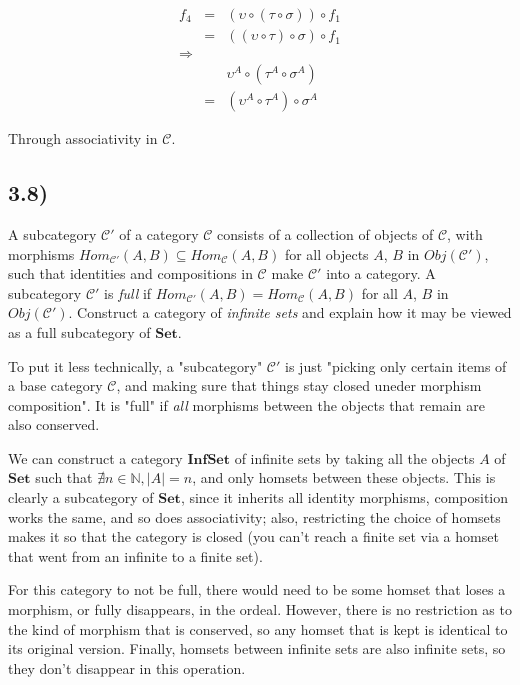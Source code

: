 \documentclass[12pt, letterpaper, twoside]{report}
\begin{document}
$$
\begin{aligned}
f_4 &=& ( \upsilon \circ (\tau  \circ \sigma)) \circ f_1 \\
	&=& ((\upsilon \circ  \tau) \circ \sigma ) \circ f_1 \\
\Rightarrow && \\
    & &  \upsilon^A \circ (\tau^A  \circ \sigma^A) \\
    &=& (\upsilon^A \circ  \tau^A) \circ \sigma^A
\end{aligned}
$$

Through associativity in $\mathcal{C}$.


\subsection*{3.8)}

A subcategory $\mathcal{C'}$ of a category $\mathcal{C}$ consists of a collection of objects of $\mathcal{C}$, with morphisms $Hom_\mathcal{C'} (A, B) \subseteq Hom_\mathcal{C} (A, B)$ for all objects $A$, $B$ in $Obj(\mathcal{C'})$, such that identities and compositions in $\mathcal{C}$ make $\mathcal{C'}$ into a category. A subcategory $\mathcal{C'}$ is \textit{full} if $Hom_\mathcal{C'} (A, B) = Hom_\mathcal{C} (A, B)$ for all $A$, $B$ in $Obj(\mathcal{C'})$. Construct a category of \textit{infinite sets} and explain how it may be viewed as a full subcategory of $\mathbf{Set}$.

To put it less technically, a "subcategory" $\mathcal{C'}$ is just "picking only certain items of a base category $\mathcal{C}$, and making sure that things stay closed uneder morphism composition". It is "full" if \textit{all} morphisms between the objects that remain are also conserved.

We can construct a category $\mathbf{InfSet}$ of infinite sets by taking all the objects $A$ of $\mathbf{Set}$ such that $\nexists n \in \mathbb{N}, |A| = n$, and only homsets between these objects. This is clearly a subcategory of $\mathbf{Set}$, since it inherits all identity morphisms, composition works the same, and so does associativity; also, restricting the choice of homsets makes it so that the category is closed (you can't reach a finite set via a homset that went from an infinite to a finite set).

For this category to not be full, there would need to be some homset that loses a morphism, or fully disappears, in the ordeal. However, there is no restriction as to the kind of morphism that is conserved, so any homset that is kept is identical to its original version. Finally, homsets between infinite sets are also infinite sets, so they don't disappear in this operation.
\end{document}
